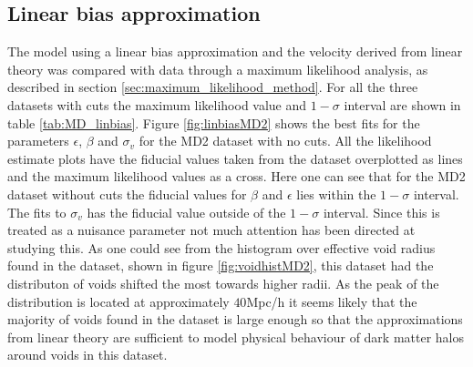 \subsection{Linear bias approximation}
The model using a linear bias approximation and the velocity derived from linear theory was compared with data through a maximum likelihood analysis, as described in section \ref{sec:maximum_likelihood_method}. For all the three datasets with cuts the maximum likelihood value and $1-\sigma$ interval are shown in table \ref{tab:MD_linbias}. Figure \ref{fig:linbiasMD2} shows the best fits for the parameters $\epsilon$, $\beta$ and $\sigma_v$ for the MD2 dataset with no cuts. All the likelihood estimate plots have the fiducial values taken from the dataset overplotted as lines and the maximum likelihood values as a cross. Here one can see that for the MD2 dataset without cuts the fiducial values for $\beta$ and $\epsilon$ lies within the $1-\sigma$ interval. The fits to $\sigma_v$ has the fiducial value outside of the $1-\sigma$ interval. Since this is treated as a nuisance parameter not much attention has been directed at studying this. As one could see from the histogram over effective void radius found in the dataset, shown in figure \ref{fig:voidhistMD2}, this dataset had the distributon of voids shifted the most towards higher radii. As the peak of the distribution is located at approximately $40$Mpc/h it seems likely that the majority of voids found in the dataset is large enough so that the approximations from linear theory are sufficient to model physical behaviour of dark matter halos around voids in this dataset.\\\indent
